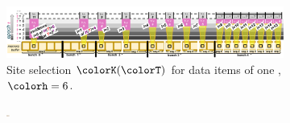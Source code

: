 \begin{figure}[htbp!]
  \flushleft
  \begin{subfigure}[b]{0.972\linewidth}
    \includegraphics[width=\textwidth, trim={0cm 0cm 0.3cm 1cm}, clip]{img/hsurf-steady-intuition}
    \vspace{-4ex}
    \caption{\footnotesize Site selection $\colorK(\colorT)$ for data items of one \hv{}, $\colorh = 6$.}
    \label{fig:hsurf-steady-intuition-diagram}
  \end{subfigure}
\vspace{-2ex}
  \flushright
  \begin{subfigure}[b]{0.98\linewidth}
    \includegraphics[width=0.011\textwidth, trim={0.2cm 2.8cm 31.8cm 2.8cm}, clip]{binder/teeplots/11/reservation-mode=steady+surface-size=32+viz=site-reservation-at-ranks-heatmap+ext=.pdf}%
\end{subfigure}
\end{figure}
